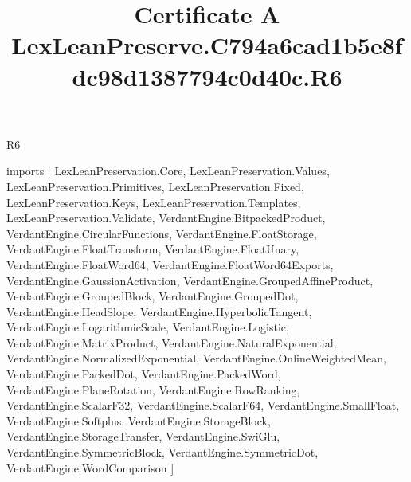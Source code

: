 \begin{lexlean}{R6}
\title{Certificate A LexLeanPreserve.C794a6cad1b5e8fdc98d1387794c0d40c.R6}
\begin{coremodule}
imports [
  LexLeanPreservation.Core,
  LexLeanPreservation.Values,
  LexLeanPreservation.Primitives,
  LexLeanPreservation.Fixed,
  LexLeanPreservation.Keys,
  LexLeanPreservation.Templates,
  LexLeanPreservation.Validate,
  VerdantEngine.BitpackedProduct,
  VerdantEngine.CircularFunctions,
  VerdantEngine.FloatStorage,
  VerdantEngine.FloatTransform,
  VerdantEngine.FloatUnary,
  VerdantEngine.FloatWord64,
  VerdantEngine.FloatWord64Exports,
  VerdantEngine.GaussianActivation,
  VerdantEngine.GroupedAffineProduct,
  VerdantEngine.GroupedBlock,
  VerdantEngine.GroupedDot,
  VerdantEngine.HeadSlope,
  VerdantEngine.HyperbolicTangent,
  VerdantEngine.LogarithmicScale,
  VerdantEngine.Logistic,
  VerdantEngine.MatrixProduct,
  VerdantEngine.NaturalExponential,
  VerdantEngine.NormalizedExponential,
  VerdantEngine.OnlineWeightedMean,
  VerdantEngine.PackedDot,
  VerdantEngine.PackedWord,
  VerdantEngine.PlaneRotation,
  VerdantEngine.RowRanking,
  VerdantEngine.ScalarF32,
  VerdantEngine.ScalarF64,
  VerdantEngine.SmallFloat,
  VerdantEngine.Softplus,
  VerdantEngine.StorageBlock,
  VerdantEngine.StorageTransfer,
  VerdantEngine.SwiGlu,
  VerdantEngine.SymmetricBlock,
  VerdantEngine.SymmetricDot,
  VerdantEngine.WordComparison
]


\end{coremodule}
\end{lexlean}
